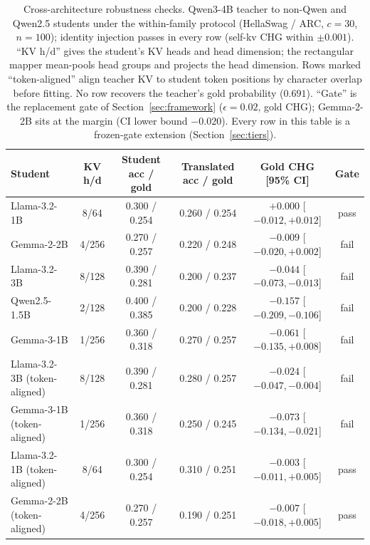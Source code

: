 \documentclass[10pt]{article}
\begin{document}
\begin{table}[t]
\centering
\caption{Cross-architecture robustness checks. Qwen3-4B teacher to non-Qwen
and Qwen2.5 students under the within-family protocol (HellaSwag / ARC,
$c{=}30$, $n{=}100$); identity injection passes in every row (self-kv CHG
within $\pm0.001$). ``KV h/d'' gives the student's KV heads and head
dimension; the rectangular mapper mean-pools head groups and projects the
head dimension. Rows marked ``token-aligned'' align teacher KV to student token
positions by character overlap before fitting. No row recovers the teacher's
gold probability ($0.691$). ``Gate'' is the replacement gate of
Section~\ref{sec:framework} ($\epsilon{=}0.02$, gold CHG); Gemma-2-2B sits at
the margin (CI lower bound $-0.020$). Every row in this table is a frozen-gate
extension (Section~\ref{sec:tiers}).}
\label{tab:crossarch}
\footnotesize
\begin{tabular}{lcccc c}
\toprule
Student & KV h/d & Student acc / gold & Translated acc / gold & Gold CHG [95\% CI] & Gate \\
\midrule
Llama-3.2-1B & 8/64 & 0.300 / 0.254 & 0.260 / 0.254 & $+0.000$ [$-0.012, +0.012$] & pass \\
Gemma-2-2B & 4/256 & 0.270 / 0.257 & 0.220 / 0.248 & $-0.009$ [$-0.020, +0.002$] & fail \\
Llama-3.2-3B & 8/128 & 0.390 / 0.281 & 0.200 / 0.237 & $-0.044$ [$-0.073, -0.013$] & fail \\
Qwen2.5-1.5B & 2/128 & 0.400 / 0.385 & 0.200 / 0.228 & $-0.157$ [$-0.209, -0.106$] & fail \\
Gemma-3-1B & 1/256 & 0.360 / 0.318 & 0.270 / 0.257 & $-0.061$ [$-0.135, +0.008$] & fail \\
\midrule
Llama-3.2-3B (token-aligned) & 8/128 & 0.390 / 0.281 & 0.280 / 0.257 & $-0.024$ [$-0.047, -0.004$] & fail \\
Gemma-3-1B (token-aligned) & 1/256 & 0.360 / 0.318 & 0.250 / 0.245 & $-0.073$ [$-0.134, -0.021$] & fail \\
Llama-3.2-1B (token-aligned) & 8/64 & 0.300 / 0.254 & 0.310 / 0.251 & $-0.003$ [$-0.011, +0.005$] & pass \\
Gemma-2-2B (token-aligned) & 4/256 & 0.270 / 0.257 & 0.190 / 0.251 & $-0.007$ [$-0.018, +0.005$] & pass \\
\bottomrule
\end{tabular}
\end{table}
\end{document}
